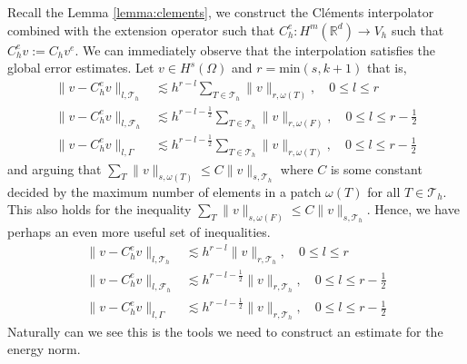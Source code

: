 Recall the Lemma \ref{lemma:clements}, we construct the Cléments interpolator combined with the extension operator such that $C_{h}^{e}: H^{m}( \mathbb{R} ^{d}) \to V_{h}$ such that  $C ^{e} _{h} v := C _{h} v^{e} $.
We can immediately observe that the interpolation satisfies the global error estimates. Let $v \in H^{s}( \Omega ) $ and $r = \mathrm{min}(s , k+1) $  that is,
\begin{align}
    \| v - C _{h}^{e} v \|_{  l, \mathcal{T} _{h} }^{  } & \lesssim h^{r-l}\sum_{T \in \mathcal{T}_h} \| v \|_{ r, \omega(T) }^{  }, \quad 0\le l\le r \\
    \| v - C ^{e}_{h}v \|_{ l,\mathcal{F} _{h} }^{  } & \lesssim h^{r-l-\frac{1}{2}}\sum_{T \in \mathcal{T}_h} \| v \|_{ r, \omega(F)  }^{  }, \quad 0  \le  l \le   r-\frac{1}{2} \\
\| v - C ^{e}_{h}v \|_{ l, \Gamma }^{  } & \lesssim h^{r-l-\frac{1}{2}} \sum_{T \in \mathcal{T}_h}  \| v \|_{ r,  \omega(T)  }^{  }, \quad 0  \le  l \le  r-\frac{1}{2}
\end{align}
 and arguing that $ \sum_{T}^{} \| v \|_{s,\omega ( T)   }^{  } \le C  \| v \|_{s, \mathcal{T}_{h}   }^{  } $ where $C$ is some constant decided by the maximum number of elements in a patch
    $\omega( T)  $ for all $T \in \mathcal{T} _{h}$. This also holds for the inequality $ \sum_{T}^{} \| v \|_{s,\omega ( F)   }^{  } \le C  \| v \|_{s, \mathcal{T}_{h}   }^{  } $. Hence, we have perhaps an even more useful set of inequalities.
\begin{align}
    \label{eq:bi_projection_estimates_1}
    \| v - C _{h}^{e} v \|_{  l, \mathcal{T} _{h} }^{  } & \lesssim h^{r-l} \| v \|_{ r, \mathcal{T} _{h} }^{  }, \quad 0\le l\le r \\
    \label{eq:bi_projection_estimates_2}
    \| v - C ^{e}_{h}v \|_{ l,\mathcal{F} _{h} }^{  } & \lesssim h^{r-l-\frac{1}{2}} \| v \|_{ r, \mathcal{T} _{h}  }^{  }, \quad 0  \le  l \le   r-\frac{1}{2} \\
    \label{eq:bi_projection_estimates_3}
\| v - C ^{e}_{h}v \|_{ l, \Gamma }^{  } & \lesssim h^{r-l-\frac{1}{2}}   \| v \|_{ r,  \mathcal{T} _{h}  }^{  }, \quad 0  \le  l \le  r-\frac{1}{2}
\end{align}
Naturally can we see this is the tools we need to construct an estimate for the energy norm.

